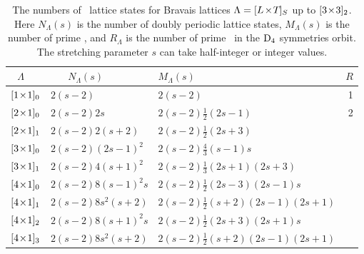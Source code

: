 
\begin{table}
\caption[]{\label{tab:LxTs}     \small
The numbers of \catlatt\ lattice states for Bravais lattices
$\Lambda={[{L_{}}\!\times\!{T_{}}]_{S_{}}}$ up to ${[3\!\times\!3]_{2}}$. Here
$N_\Lambda(s)$ is the number of doubly periodic
lattice states,
$M_\Lambda(s)$ is the number of prime \twots,
and $R_{\Lambda}$ is the number
of prime \twots\ in the $\textrm{D}_{4}$ symmetries orbit.
The stretching parameter ${s}$ can take half-integer or integer
values.
}
\begin{center}
{\small
\begin{tabular}{lllr}
\\[-16pt]
$~~~\Lambda$
                         & ~~~$N_\Lambda(s)$ & $M_\Lambda(s)$
                                                 &$R$  \\
\hline
${[1\!\times\!1]_{0}}$    &   $2({s}-2)$ & $2({s}-2)$ & 1 \\
${[2\!\times\!1]_{0}}$    &   $2({s}-2)2s$ & $2({s}-2)\frac{1}{2}(2{s}-1)$   & 2 \\
${[2\!\times\!1]_{1}}$  &   $2({s}-2)2({s}+2)$ & $2({s}-2)\frac{1}{2}(2{s}+3)$  & \\
${[3\!\times\!1]_{0}}$    &   $2({s}-2)(2{s}-1)^2$ & $2({s}-2)\frac{4}{3}({s}-1){s}$ &  \\
${[3\!\times\!1]_{1}}$  &   $2({s}-2)4({s}+1)^2$ & $2({s}-2)\frac{1}{3}(2{s}+1)(2{s}+3)$ & \\
${[4\!\times\!1]_{0}}$    &   $2({s}-2)8({s}-1)^2{s}$ & $2({s}-2)\frac{1}{2}(2{s}-3)(2{s}-1)s$ & \\
${[4\!\times\!1]_{1}}$  &   $2({s}-2)8s^2({s}+2)$ & $2({s}-2)\frac{1}{2}({s}+2)(2{s}-1)(2{s}+1)$ & \\
${[4\!\times\!1]_{2}}$  &   $2({s}-2)8({s}+1)^2{s}$ & $2({s}-2)\frac{1}{2}(2{s}+3)(2{s}+1)s$     & \\
${[4\!\times\!1]_{3}}$  &   $2({s}-2)8s^2({s}+2)$ & $2({s}-2)\frac{1}{2}({s}+2)(2{s}-1)(2{s}+1)$ &  \\

\end{tabular}}
\end{center}
\end{table}
